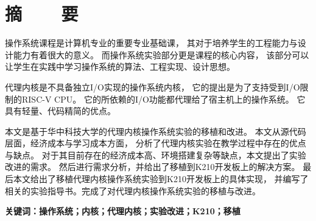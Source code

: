 %
%
%
%
%

\vspace*{-11mm}

\begin{center}
  \heiti{}\textbf{\thesisTitle}
\end{center}

\vspace*{2mm}

{\let\clearpage\relax \chapter*{\textmd{摘~~~~要}}}
\setcounter{page}{1}

\vspace*{1mm}

\setlength{\parskip}{0em}

操作系统课程是计算机专业的重要专业基础课，
其对于培养学生的工程能力与设计能力有着很大的意义。
而操作系统实验部分更是课程的核心内容，
该部分可以让学生在实践中学习操作系统的算法、工程实现、设计思想。

代理内核是不具备独立I/O实现的操作系统内核，
它的提出是为了支持受到I/O限制的RISC-V CPU。
它的所依赖的I/O功能都代理给了宿主机上的操作系统。
它具有轻量、代码精简的优点。

本文是基于华中科技大学的代理内核操作系统实验的移植和改进。
本文从源代码层面，经济成本与学习成本方面，
分析了代理内核实验在教学过程中存在的优点与缺点。
对于其目前存在的经济成本高、环境搭建复杂等缺点，本文提出了实验改进的需求。
然后进行需求分析，并给出了移植到K210开发板上的解决方案。
最后本文给出了移植代理内核操作系统实验到K210开发板上的具体实现，
并编写了相关的实验指导书。完成了对代理内核操作系统实验的移植与改进。

\vspace{4ex}\noindent\textbf{\heiti 关键词：操作系统；内核；代理内核；实验改进；K210；移植}
\newpage

